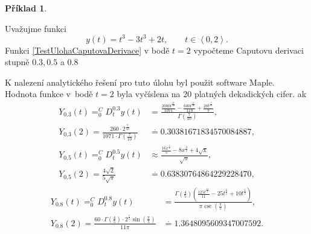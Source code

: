 \documentclass[a4paper,12pt,twoside]{article}
\theoremstyle{definition}
\newtheorem{prikl}[veta]{Příklad}
\theoremstyle{remark}
\numberwithin{equation}{section}
\numberwithin{table}{section}
\numberwithin{figure}{section}
\begin{document}
\begin{prikl}\label{TestUlohaL1Metoda}

Uvažujme funkci 
\begin{equation} \label{TestUlohaCaputovaDerivace}
	y\left(t\right) = t^{3} - 3t^{3} + 2t, \qquad t \in \left\langle 0, 2\right\rangle.
\end{equation}
Funkci \eqref{TestUlohaCaputovaDerivace} v bodě $t = 2$ vypočteme Caputovu derivaci stupně $0.3, 0.5$ a $0.8$ %

K nalezení analytického řešení pro tuto úlohu byl použit software Maple. Hodnota funkce v~bodě $t = 2$ byla vyčíslena na 20 platných dekadických cifer. ak
\begin{equation}
	\begin{aligned}
		Y_{0.3}\left(t\right) = ^{C}_{0}D^{0.3}_{t} y\left(t\right) &=  \frac{\frac{2000 t^{\frac{27}{10}}}{1071}-\frac{600 t^{\frac{17}{10}}}{119}+\frac{20 t^{\frac{7}{10}}}{7}}{\Gamma \! \left(\frac{7}{10}\right)}, \\
		Y_{0.3}\left(2\right) = \frac{260\cdot2^{\frac{7}{10}}}{1071\cdot\Gamma\left(\frac{7}{10}\right)} 	&\overset{.}{=}  0.30381671834570084887,	
	\end{aligned}
\end{equation}
\begin{equation}
	\begin{aligned}
		Y_{0.5}\left(t\right) = ^{C}_{0}D^{0.5}_{t} y\left(t\right) &\approx   \frac{\frac{16 x^{\frac{5}{2}}}{5}-8 x^{\frac{3}{2}}+4 \mathrm{\sqrt{x}}}{\sqrt{\pi}}, \\
		Y_{0.5}\left(2\right) = \frac{4 \sqrt{2}}{5 \sqrt{\pi}}&\overset{.}{=}   0.63830764864229228470,
	\end{aligned}
\end{equation}
\begin{equation}
	\begin{aligned}
		Y_{0.8}\left(t\right) = ^{C}_{0}D^{0.8}_{t} y\left(t\right) &=   \frac{\Gamma \! \left(\frac{4}{5}\right) \left(\frac{125 t^{\frac{11}{5}}}{11}-25 t^{\frac{6}{5}}+10 t^{\frac{1}{5}}\right)}{\pi  \csc\! \left(\frac{\pi}{5}\right)}, \\
		Y_{0.8}\left(2\right) =\frac{60 \cdot \Gamma \! \left(\frac{4}{5}\right) \cdot 2^{\frac{1}{5}} \sin \left(\frac{\pi}{5}\right)}{11 \pi }	&\overset{.}{=}  1.3648095609347007592.
	\end{aligned}
\end{equation}


\end{prikl}
\end{document}
